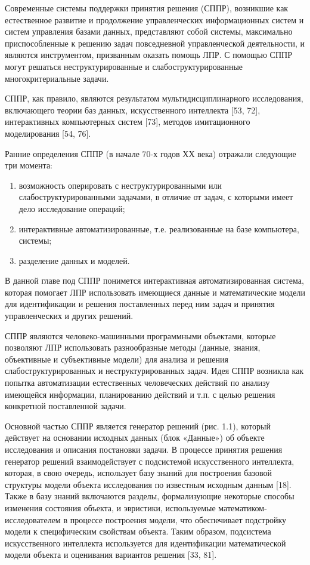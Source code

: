 Современные системы поддержки принятия решения
(СППР), возникшие как естественное развитие
и продолжение управленческих информационных
систем и систем управления базами данных, представляют
собой системы, максимально приспособленные
к решению задач повседневной управленческой
деятельности, и являются инструментом, призванным
оказать помощь ЛПР. С помощью СППР могут решаться
неструктурированные и слабоструктурированные
многокритериальные задачи.

СППР, как правило, являются результатом мультидисциплинарного
исследования, включающего теории баз данных,
искусственного интеллекта [53, 72], интерактивных
компьютерных систем [73], методов имитационного
моделирования [54, 76].

Ранние определения СППР (в начале 70-х годов
ХХ века) отражали следующие три момента:
\begin{enumerate}
\item возможность оперировать с неструктурированными
или слабоструктурированными задачами, в отличие
от задач, с которыми имеет дело исследование
операций;
\item интерактивные автоматизированные, т.е. реализованные
на базе компьютера, системы;
\item разделение данных и моделей.
\end{enumerate}

В данной главе под СППР понимется интерактивная автоматизированная система, которая помогает ЛПР использовать имеющиеся данные и математические модели для идентификации и решения поставленных перед ним задач и принятия управленческих и других решений.

СППР являются человеко-машинными программными объектами, которые позволяют ЛПР использовать разнообразные методы (данные, знания, объективные и субъективные модели) для анализа и решения слабоструктурированных и неструктурированных задач. Идея СППР возникла как попытка автоматизации естественных человеческих действий по анализу имеющейся информации, планированию действий и т.п. с целью решения конкретной поставленной задачи.

Основной частью СППР является генератор решений
(рис. 1.1), который действует на основании исходных
данных (блок «Данные») об объекте исследования
и описания постановки задачи. В процессе принятия
решения генератор решений взаимодействует
с подсистемой искусственного интеллекта, которая,
в свою очередь, использует базу знаний для построения
базовой структуры модели объекта исследования
по известным исходным данным [18]. Также в базу
знаний включаются разделы, формализующие некоторые
способы изменения состояния объекта, и эвристики,
используемые математиком-исследователем в
процессе построения модели, что обеспечивает
подстройку модели к специфическим свойствам
объекта. Таким образом, подсистема искусственного
интеллекта используется для идентификации
математической модели объекта и оценивания
вариантов решения [33, 81].


